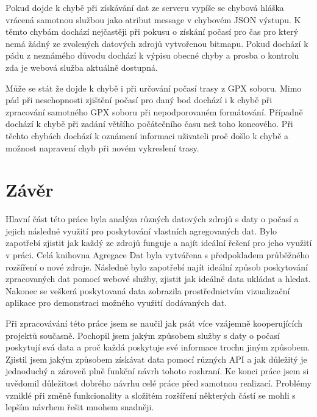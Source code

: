 \documentclass[czech,bachelor,dept460,male,csharp,cpdeclaration]{diploma}
\begin{document}
	Pokud dojde k chybě při získávání dat ze serveru vypíše se chybová hláška vrácená samotnou službou jako atribut message v chybovém JSON výstupu. K těmto chybám dochází nejčastěji při pokusu o získání počasí pro čas pro který nemá žádný ze zvolených datových zdrojů vytvořenou bitmapu. Pokud dochází k pádu z neznámého důvodu dochází k výpisu obecné chyby a prosba o kontrolu zda je webová služba aktuálně dostupná.
	
	Může se stát že dojde k chybě i při určování počasí trasy z GPX soboru. Mimo pád při neschopnosti zjištění počasí pro daný bod dochází i k chybě při zpracování samotného GPX soboru při nepodporovaném formátování. Případně dochází k chybě při zadání většího počátečního času než toho koncového. Při těchto chybách dochází k oznámení informaci uživateli proč došlo k chybě a možnost napravení chyb při novém vykreslení trasy.
	
	\chapter{Závěr}
	
	Hlavní část této práce byla analýza různých datových zdrojů s daty o počasí a jejich následné využití pro poskytování vlastních agregovaných dat. Bylo zapotřebí zjistit jak každý ze zdrojů funguje a najít ideální řešení pro jeho využití v práci. Celá knihovna Agregace Dat byla vytvářena s předpokladem průběžného rozšíření o nové zdroje. Následně bylo zapotřebí najít ideální způsob poskytování zpracovaných dat pomocí webové služby, zjistit jak ideálně data ukládat a hledat. Nakonec se veškerá poskytovaná data zobrazila prostřednictvím vizualizační aplikace pro demonstraci možného využití dodávaných dat.
	
	Při zpracovávání této práce jsem se naučil jak psát více vzájemně kooperujících projektů současně. Pochopil jsem jakým způsobem služby s daty o počasí poskytují svá data a proč každá poskytuje své informace trochu jiným způsobem. Zjistil jsem jakým způsobem získávat data pomocí různých API a jak důležitý je jednoduchý a zároveň plně funkční návrh tohoto rozhraní. Ke konci práce jsem si uvědomil důležitost dobrého návrhu celé práce před samotnou realizací. Problémy vzniklé při změně funkcionality a složitém rozšíření některých částí se mohli s lepším návrhem řešit mnohem snadněji.
	
	\nocite{*}
	
	\printbibliography[title={Literatura}, heading=bibintoc]
	
	
\end{document}
